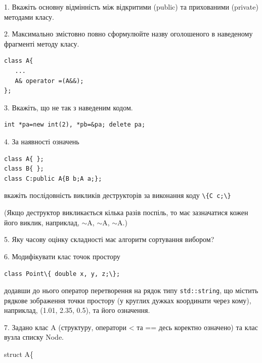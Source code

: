 \documentclass[12pt, ukrainian]{article}
\def\code#1{\Verb!#1!}
\begin{document}
{%
1. Вкажіть основну відмінність між відкритими (public) та прихованими (private) методами класу.%
\par
\vspace{2mm}
2. Максимально змістовно повно сформулюйте назву оголошеного в наведеному фрагменті методу класу.
\vspace{-3mm}
\begin{verbatim}class A{
   ...
   A& operator =(A&&);
};\end{verbatim}
\vspace{-3mm}
\par
\vspace{2mm}
3. Вкажіть, що не так з наведеним кодом.
\vspace{-3mm}
\begin{verbatim}int *pa=new int(2), *pb=&pa; delete pa;\end{verbatim}
\vspace{-3mm}
\par
\vspace{2mm}
4. За наявності означень
\vspace{-3mm}
\begin{verbatim}
class A{ };
class B{ };
class C:public A{B b;A a;};\end{verbatim}
\vspace{-3mm}
вкажіть послідовність викликів деструкторів за виконання коду \code{\{C c;\}} 

(Якщо деструктор викликається кілька разів поспіль, то має зазначатися кожен його виклик, наприклад, $\sim$A, $\sim$A, $\sim$A.)

\vspace{2mm}
5. Яку часову оцінку складності має алгоритм сортування вибором?
\par
\vspace{2mm}
6. Модифікувати клас точок простору 

\qquad\code{class Point\{ double x, y, z;\};}


додавши до нього оператор перетворення на рядок типу \code{std::string}, що містить рядкове зображення точки простору (у круглих дужках координати через кому), наприклад, (1.01, 2.35, 0.5), та його означення.%
\par
\vspace{2mm}
7. 
Задано клас A (структуру, оператори < та == десь коректно означено) та клас вузла списку Node.

struct A\{

}
\end{document}

